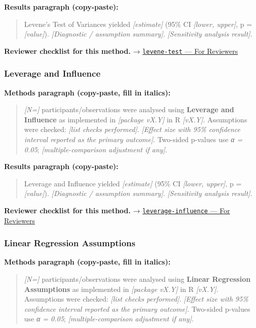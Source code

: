 \documentclass[
]{article}
\begin{document}
\textbf{Results paragraph (copy-paste):}

\begin{quote}
Levene's Test of Variances yielded \emph{{[}estimate{]}} (95\% CI
\emph{{[}lower, upper{]}}, p = \emph{{[}value{]}}). \emph{{[}Diagnostic
/ assumption summary{]}}. \emph{{[}Sensitivity analysis result{]}}.
\end{quote}

\textbf{Reviewer checklist for this method.} →
\href{../chapters/04-inferential/levene-test.Rmd\#for-reviewers}{\texttt{levene-test}
--- For Reviewers}

\subsubsection{Leverage and Influence}\label{leverage-and-influence}

\textbf{Methods paragraph (copy-paste, fill in italics):}

\begin{quote}
\emph{{[}N={]}} participants/observations were analysed using
\textbf{Leverage and Influence} as implemented in \emph{{[}package
vX.Y{]}} in R \emph{{[}vX.Y{]}}. Assumptions were checked: \emph{{[}list
checks performed{]}}. \emph{{[}Effect size with 95\% confidence interval
reported as the primary outcome{]}}. Two-sided p-values use \emph{α =
0.05}; \emph{{[}multiple-comparison adjustment if any{]}}.
\end{quote}

\textbf{Results paragraph (copy-paste):}

\begin{quote}
Leverage and Influence yielded \emph{{[}estimate{]}} (95\% CI
\emph{{[}lower, upper{]}}, p = \emph{{[}value{]}}). \emph{{[}Diagnostic
/ assumption summary{]}}. \emph{{[}Sensitivity analysis result{]}}.
\end{quote}

\textbf{Reviewer checklist for this method.} →
\href{../chapters/07-regression/leverage-influence.Rmd\#for-reviewers}{\texttt{leverage-influence}
--- For Reviewers}

\subsubsection{Linear Regression
Assumptions}\label{linear-regression-assumptions}

\textbf{Methods paragraph (copy-paste, fill in italics):}

\begin{quote}
\emph{{[}N={]}} participants/observations were analysed using
\textbf{Linear Regression Assumptions} as implemented in
\emph{{[}package vX.Y{]}} in R \emph{{[}vX.Y{]}}. Assumptions were
checked: \emph{{[}list checks performed{]}}. \emph{{[}Effect size with
95\% confidence interval reported as the primary outcome{]}}. Two-sided
p-values use \emph{α = 0.05}; \emph{{[}multiple-comparison adjustment if
any{]}}.
\end{quote}
\end{document}

